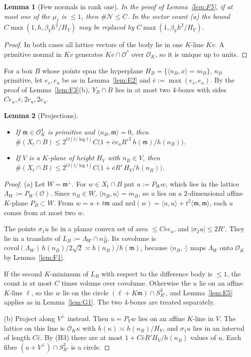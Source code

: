\documentclass[aps,prx,twocolumn,superscriptaddress,nofootinbib,longbibliography]{revtex4-2}
\theoremstyle{plain}
\newtheorem{lemma}{Lemma}
\theoremstyle{definition}
\theoremstyle{remark}
\begin{document}
\begin{lemma}[Few normals in rank one]\label{lem:G2}
In the proof of Lemma~\ref{lem:F5}, if at most one of the $\mu_j$ is $\le1$, then $\#\mathcal N\le C$. In the
sector count (a) the bound $C\max(1,h,\beta_Vh^2/H_V)$ may be replaced by $C\max(1,\beta_Vh^2/H_V)$.
\end{lemma}
\begin{proof}
In both cases all lattice vectors of the body lie in one $K$-line $Kv$. A primitive normal in $Kv$
generates $Kv\cap\mathcal O^*$ over $\mathcal O_K$, so it is unique up to units.
\end{proof}

For a box $B$ whose points span the hyperplane $H_B=\{\langle n_B,x\rangle=m_B\}$, $n_B$ primitive, let
$e_s,e_u$ be as in Lemma~\ref{lem:E2} and $\bar e:=\max(e_s,e_u)$. By the proof of
Lemma~\ref{lem:F3}(b), $Y_B\cap B$ lies in at most two $4$-boxes with sides $Ce_u,\bar e,2e_u,2e_u$.

\begin{lemma}[Projections]\label{lem:G3}
\begin{itemize}\setlength\itemsep{0pt}
\item[(a)] If $\mathfrak m\in\mathcal O_K^4$ is primitive and $\langle n_B,\mathfrak m\rangle=0$, then
$\#(X_t\cap B)\le2^{O(t/\log t)}C\big(1+\bar ee_uR'^2\,h(\mathfrak m)/h(n_B)\big)$.
\item[(b)] If $V$ is a $K$-plane of height $H_V$ with $n_B\in V$, then
$\#(X_t\cap B)\le2^{O(t/\log t)}C\big(1+\bar eR'\,H_V/h(n_B)\big)$.
\end{itemize}
\end{lemma}
\begin{proof}
(a) Let $W=\mathfrak m^\perp$. For $w\in X_t\cap B$ put $u:=P_Ww$, which lies in the lattice
$\Lambda_W:=P_W(\mathcal O)$. Since $n_B\in W$, $\langle n_B,u\rangle=m_B$, so $u$ lies on a $2$-dimensional affine
$K$-plane $P_B\subset W$. From $w=u+t\mathfrak m$ and
$\mathrm{nrd}(w)=\langle u,u\rangle+t^2\langle\mathfrak m,\mathfrak m\rangle$, each $u$ comes from at most two $w$.

The points $\sigma_1u$ lie in a planar convex set of area $\le C\bar ee_u$, and $|\sigma_2u|\le2R'$. They lie in
a translate of $L_B:=\Lambda_W\cap n_B^\perp$. Its covolume is
$\mathrm{covol}(\Lambda_W)\,h(n_B)/2\sqrt2\asymp h(n_B)/h(\mathfrak m)$, because
$\langle n_B,\cdot\rangle$ maps $\Lambda_W$ onto $\mathcal O_K$ by Lemma~\ref{lem:F1}.

If the second $K$-minimum of $L_B$ with respect to the difference body is $\le1$, the count is at most $C$
times volume over covolume. Otherwise the $u$ lie on an affine $K$-line $\ell$, so the $w$ lie on the circle
$(\ell+K\mathfrak m)\cap S^3_{R'}$, and Lemma~\ref{lem:E5} applies as in Lemma~\ref{lem:G1}. The two
$4$-boxes are treated separately.

(b) Project along $V^\perp$ instead. Then $u=P_Vw$ lies on an affine $K$-line in $V$. The lattice on this
line is $\mathcal O_K\kappa$ with $h(\kappa)\asymp h(n_B)/H_V$, and $\sigma_1u$ lies in an interval of length
$C\bar e$. By (H3) there are at most $1+C\bar eR'H_V/h(n_B)$ values of $u$. Each fibre $(u+V^\perp)\cap S^3_{R'}$
is a circle.
\end{proof}
\end{document}
